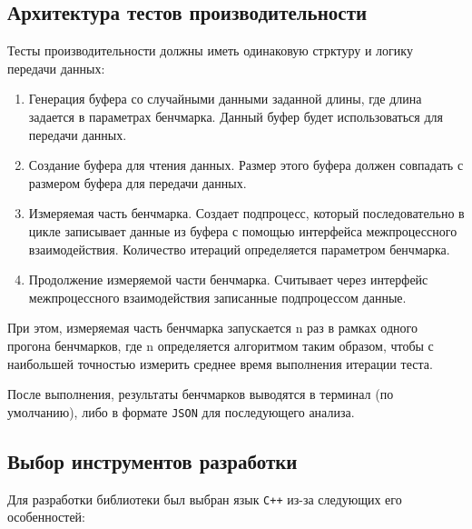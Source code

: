 \documentclass[14pt, russian]{scrartcl}
\begin{document}

\subsection{Архитектура тестов производительности}

Тесты производительности должны иметь одинаковую стрктуру и логику передачи
данных:

\begin{enumerate}
  \item Генерация буфера со случайными данными заданной длины, где длина
        задается в параметрах бенчмарка. Данный буфер будет использоваться для
        передачи данных.
  \item Создание буфера для чтения данных. Размер этого буфера должен совпадать
        с размером буфера для передачи данных.
  \item Измеряемая часть бенчмарка. Создает подпроцесс, который последовательно
        в цикле записывает данные из буфера с помощью интерфейса межпроцессного
        взаимодействия. Количество итераций определяется параметром бенчмарка.
  \item Продолжение измеряемой части бенчмарка. Считывает через интерфейс
        межпроцессного взаимодействия записанные подпроцессом данные.
\end{enumerate}

При этом, измеряемая часть бенчмарка запускается n раз в рамках одного прогона
бенчмарков, где n определяется алгоритмом таким образом, чтобы с наибольшей
точностью измерить среднее время выполнения итерации теста.

После выполнения, результаты бенчмарков выводятся в терминал (по умолчанию),
либо в формате \verb|JSON| для последующего анализа.

\subsection{Выбор инструментов разработки}

Для разработки библиотеки был выбран язык \verb|C++|\cite{Cppreference} из-за
следующих его особенностей:
\end{document}
